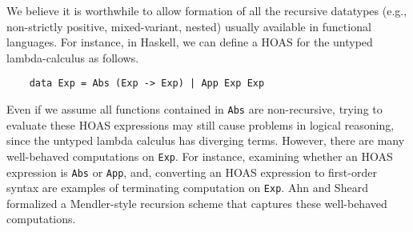 \documentclass[a4paper]{easychair} %
\newcommand{\eg}[0]{{e.g.}}
\begin{document}
We believe it is worthwhile to allow formation of all the recursive datatypes
(\eg, non-strictly positive, mixed-variant, nested)
usually available in functional languages. For instance,
in Haskell, we can define a HOAS for the untyped lambda-calculus
as follows.
\begin{verbatim}
    data Exp = Abs (Exp -> Exp) | App Exp Exp
\end{verbatim}
Even if we assume all functions contained in \texttt{Abs} are non-recursive,
trying to evaluate these HOAS expressions may still cause problems in logical reasoning,
since the untyped lambda calculus has diverging terms. However, there are
many well-behaved computations on \texttt{Exp}. For instance, examining whether
an HOAS expression is \texttt{Abs} or \texttt{App}, and, converting an HOAS expression
to first-order syntax are examples of terminating computation on \texttt{Exp}.
Ahn and Sheard \cite{AhnShe11} formalized a Mendler-style recursion scheme
that captures these well-behaved computations.
\end{document}
